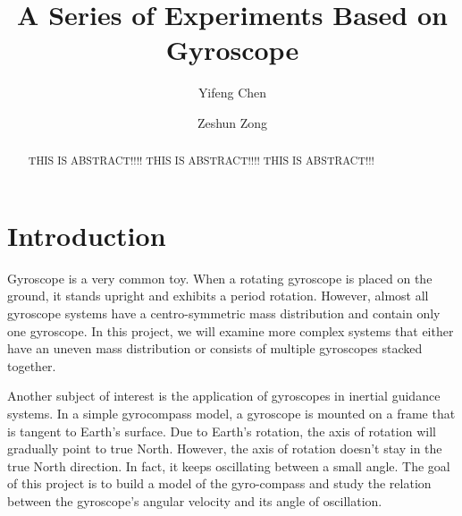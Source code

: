 \documentclass[12pt]{article}
\renewcommand{\(}{\left (}
\renewcommand{\)}{\right )}
\begin{document}
\title{A Series of Experiments Based on Gyroscope}
\date{}
\author[1]{Yifeng Chen}
\author[2]{Zeshun Zong}


\maketitle

\begin{abstract}
	THIS IS ABSTRACT!!!! THIS IS ABSTRACT!!!! THIS IS ABSTRACT!!!
\end{abstract}

\section{Introduction}

\hspace{5mm} Gyroscope is a very common toy. When a rotating gyroscope is placed on the ground, it stands upright and exhibits a period rotation. However, almost all gyroscope systems have a centro-symmetric mass distribution and contain only one gyroscope. In this project, we will examine more complex systems that either have an uneven mass distribution or consists of multiple gyroscopes stacked together.

Another subject of interest is the application of gyroscopes in inertial guidance systems. In a simple gyrocompass model, a gyroscope is mounted on a frame that is tangent to Earth's surface. Due to Earth's rotation, the axis of rotation will gradually point to true North. However, the axis of rotation doesn't stay in the true North direction. In fact, it keeps oscillating between a small angle. The goal of this project is to build a model of the gyro-compass and study the relation between the gyroscope's angular velocity and its angle of oscillation.
\end{document}
